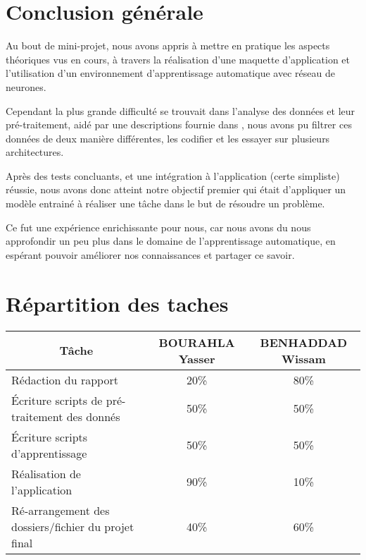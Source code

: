 \section{Conclusion générale}
Au bout de mini-projet, nous avons appris à mettre en pratique les aspects théoriques vus en cours, à travers la réalisation d'une maquette d'application et l'utilisation d'un environnement d'apprentissage automatique avec réseau de neurones.
\par 
Cependant la plus grande difficulté se trouvait dans l'analyse des données et leur pré-traitement, aidé par une descriptions fournie dans \cite{datasetDetails}, nous avons pu filtrer ces données de deux manière différentes, les codifier et les essayer sur plusieurs architectures.\par
Après des tests concluants, et une intégration à l'application (certe simpliste)  réussie, nous avons donc atteint notre objectif premier qui était d'appliquer un modèle entrainé à réaliser une tâche dans le but de résoudre un problème.\par 
Ce fut une expérience enrichissante pour nous, car nous avons du nous approfondir un peu plus  dans le domaine de l'apprentissage automatique, en espérant pouvoir améliorer nos connaissances et partager ce savoir.

\section{Répartition des taches}

\begin{table}[H]
	\centering
	\begin{tabular}{|l|c|c|}
		\hline
		\multicolumn{1}{|c|}{Tâche}                      & BOURAHLA Yasser & BENHADDAD Wissam \\ \hline
		Rédaction du rapport                             & 20\%            & 80\%             \\ \hline
		Écriture scripts de pré-traitement des donnés         & 50\%            & 50\%             \\ \hline
		Écriture scripts d'apprentissage    & 50\%            & 50\%             \\ \hline
		Réalisation de l'application                     & 90\%            & 10\%             \\ \hline
		Ré-arrangement des dossiers/fichier du projet final & 40\%            & 60\%             \\ \hline
	\end{tabular}
\end{table}